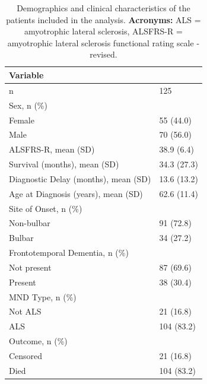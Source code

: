 \begin{table}
\centering
\caption[Demographics and clinical characteristics of the patients included in the Cox proportional hazards model analysis.]{Demographics and clinical characteristics of the patients included in the analysis. \textbf{Acronyms:} ALS = amyotrophic lateral sclerosis, ALSFRS-R = amyotrophic lateral sclerosis functional rating scale - revised.}
\label{tab:coxdemographics}
\begin{tabular}{|ll|}
\hline
              \textbf{Variable}                          &      \\
\hline
 n                               & 125         \\\hline
 Sex, n (\%)          & \\
 \hspace{5mm}Female & 55 (44.0)   \\
\hspace{5mm}Male & 70 (56.0)   \\\hline
 ALSFRS-R, mean (SD)                 & 38.9 (6.4)  \\\hline
 Survival (months), mean (SD)         & 34.3 (27.3) \\\hline
 Diagnostic Delay (months), mean (SD)  & 13.6 (13.2) \\\hline
 Age at Diagnosis (years), mean (SD)  & 62.6 (11.4) \\\hline
 Site of Onset, n (\%)        &  \\
 \hspace{5mm}Non-bulbar   & 91 (72.8)   \\
 \hspace{5mm}Bulbar  & 34 (27.2)   \\\hline
 Frontotemporal Dementia, n (\%)       & \\
 \hspace{5mm}Not present & 87 (69.6)   \\
\hspace{5mm}Present & 38 (30.4)   \\\hline
 MND Type, n (\%)                & \\
 \hspace{5mm}Not ALS   & 21 (16.8)   \\
 \hspace{5mm}ALS   & 104 (83.2)  \\\hline
 Outcome, n (\%)                          & \\
 \hspace{5mm}Censored   & 21 (16.8)   \\
\hspace{5mm}Died   & 104 (83.2)  \\\hline

\end{tabular}
\end{table}

